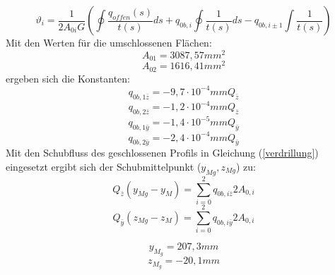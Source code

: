 \begin{equation}
	\vartheta_{i} = \frac{1}{2A_{0i}G}(\oint\frac{q_{offen}(s)}{t(s)}ds+q_{0b,i}\oint\frac{1}{t(s)}ds-q_{0b,i\pm1}\int\frac{1}{t(s)})
\end{equation}
Mit den Werten für die umschlossenen Flächen:
\begin{equation}
	A_{01}=3087,57mm^2
\end{equation}
\begin{equation}
	A_{02}=1616,41mm^2
\end{equation}
ergeben sich die Konstanten:
\begin{equation}
	q_{0b,1\bar{z}}=-9,7\cdot10^{-4}mmQ_{\bar{z}}
\end{equation}
\begin{equation}
	q_{0b,2\bar{z}}=-1,2\cdot10^{-4}mmQ_{\bar{z}}
\end{equation}
\begin{equation}
	q_{0b,1\bar{y}}=-1,4\cdot10^{-5}mmQ_{\bar{y}}
\end{equation}
\begin{equation}
	q_{0b,2\bar{y}}=-2,4\cdot10^{-4}mmQ_{\bar{y}}
\end{equation}
Mit den Schubfluss des geschlossenen Profils in Gleichung (\ref{verdrillung}) eingesetzt ergibt sich der Schubmittelpunkt ($y_{Mg}, z_{Mg}$) zu:
\begin{equation}
	Q_{\bar{z}}(y_{Mg}-y_{M})=\sum_{i=0}^{2}q_{0b,i\bar{z}}2A_{0,i}
\end{equation}
\begin{equation}
Q_{\bar{y}}(z_{Mg}-z_{M})=\sum_{i=0}^{2}q_{0b,i\bar{y}}2A_{0,i}
\end{equation}

\begin{equation}
	y_{M_{g}}=207,3mm
\end{equation}
\begin{equation}
	z_{M_{g}}=-20,1mm
\end{equation}

